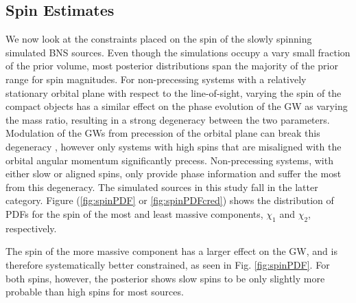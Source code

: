 \subsection{Spin Estimates}\label{sec:spin-magnitudes}
We now look at the constraints placed on the spin of the slowly spinning simulated BNS sources.  Even though the simulations occupy a vary small fraction of the prior volume, most posterior distributions span the majority of the prior range for spin magnitudes. For non-precessing systems with a relatively stationary orbital plane with respect to the line-of-sight, varying the spin of the compact objects has a similar effect on the phase evolution of the GW as varying the mass ratio, resulting in a strong degeneracy between the two parameters.  Modulation of the GWs from precession of the orbital plane can break this degeneracy \citep{Vecchio_2004,Lang_2006,Vitale_2014,Chatziioannou_2014}, however only systems with high spins that are misaligned with the orbital angular momentum significantly precess. Non-precessing systems, with either slow or aligned spins, only provide phase information and suffer the most from this degeneracy.  The simulated sources in this study fall in the latter category.  Figure (\ref{fig:spinPDF} or \ref{fig:spinPDFcred}) shows the distribution of PDFs for the spin of the most and least massive components, $\chi_1$ and $\chi_2$, respectively.

The spin of the more massive component has a larger effect on the GW, and is therefore systematically better constrained, as seen in Fig. \ref{fig:spinPDF}.  For both spins, however, the posterior shows slow spins to be only slightly more probable than high spins for most sources.
  
  
  
  